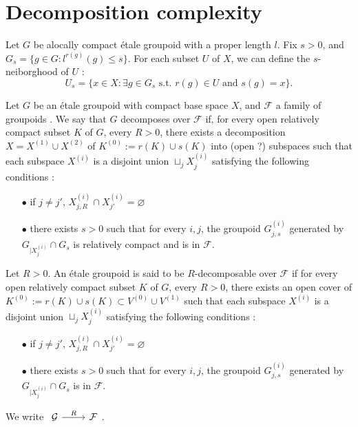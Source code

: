 \section{Decomposition complexity}

Let $G$ be alocally compact étale groupoid with a proper length $l$. Fix $s>0$, and $G_s=\{g\in G : l^{r(g)}(g)\leq s\}$. For each subset $U$ of $X$, we can define the $s$-neiborghood of $U$ :
\[U_s = \{x\in X : \exists g\in G_s \text{ s.t. } r(g)\in U \text{ and } s(g)=x \}.\]

\begin{definition}
Let $G$ be an étale groupoid with compact base space $X$, and $\mathcal F$ a family of groupoids . We say that $G$ decomposes over $\mathcal F$ if, for every open relatively compact subset $K$ of $G$, every $R>0$, there exists a decomposition $X=X^{(1)}\cup X^{(2)}$ of $K^{(0)}:= r(K)\cup s(K)$ into (open ?) subspaces such that each subspace $X^{(i)}$ is a disjoint union $\sqcup_j X^{(i)}_j$ satisfying the following conditions :
\begin{itemize}
\item[$\bullet$] if $j\neq j'$,  $X^{(i)}_{j,R}\cap X^{(i)}_{j'}=\varnothing$
\item[$\bullet$] there exists $s>0$ such that for every $i,j$, the groupoid $G_{j,s}^{(i)}$ generated by $G_{|X^{(i)}_j}\cap G_s$ is relatively compact and is in $\mathcal F$.
\end{itemize}
\end{definition}

\begin{definition}
Let $R>0$. An étale groupoid is said to be $R$-decomposable over $\mathcal F$ if for every open relatively compact subset $K$ of $G$, every $R>0$, there exists an open cover of $K^{(0)}:= r(K)\cup s(K)\subset V^{(0)}\cup V^{(1)}$ such that each subspace $X^{(i)}$ is a disjoint union $\sqcup_j X^{(i)}_j$ satisfying the following conditions :
\begin{itemize}
\item[$\bullet$] if $j\neq j'$,  $X^{(i)}_{j,R}\cap X^{(i)}_{j'}=\varnothing$
\item[$\bullet$] there exists $s>0$ such that for every $i,j$, the groupoid $G_{j,s}^{(i)}$ generated by $G_{|X^{(i)}_j}\cap G_s$ is in $\mathcal F$.
\end{itemize}
We write $\begin{tikzcd}\mathcal G \arrow{r}{R} & \mathcal F\end{tikzcd}$.
\end{definition}

